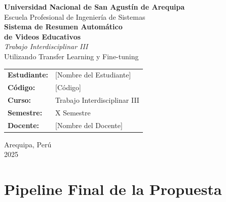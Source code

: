 \documentclass[12pt,a4paper]{article}
\begin{document}
\begin{titlepage}
    \centering
    
    \vspace*{1cm}
    
    {\LARGE\bfseries Universidad Nacional de San Agustín de Arequipa}\\[0.5cm]
    {\large Escuela Profesional de Ingeniería de Sistemas}\\[2cm]
    
    {\Huge\bfseries Sistema de Resumen Automático\\[0.3cm] de Videos Educativos}\\[1cm]
    
    {\Large\textit{Trabajo Interdisciplinar III}}\\[0.5cm]
    {\large Utilizando Transfer Learning y Fine-tuning}\\[3cm]
    
    \begin{tabular}{ll}
        \textbf{Estudiante:} & [Nombre del Estudiante] \\
        \textbf{Código:} & [Código] \\
        \textbf{Curso:} & Trabajo Interdisciplinar III \\
        \textbf{Semestre:} & X Semestre \\
        \textbf{Docente:} & [Nombre del Docente] \\
    \end{tabular}
    
    \vfill
    
    {\large Arequipa, Perú}\\
    {\large 2025}
    
\end{titlepage}

\tableofcontents
\newpage


\section{Pipeline Final de la Propuesta}
\end{document}
